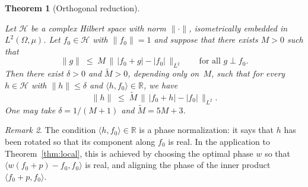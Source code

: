 \documentclass[11pt]{amsart}
\newtheorem{theorem}{Theorem}[section]
\theoremstyle{remark}
\newtheorem{remark}[theorem]{Remark}
\begin{document}
\begin{theorem}[Orthogonal reduction]\label{thm:reduction}
\par
Let $\mathcal{H}$ be a complex Hilbert space with norm $\lVert \cdot \rVert$, isometrically
embedded in $L^2(\Omega,\mu)$.  Let $f_0 \in \mathcal{H}$ with $\lVert f_0 \rVert = 1$ and
suppose that there exists $M > 0$ such that
\begin{equation}\label{eq:orthog-hyp}
\lVert g \rVert
\;\le\;
M\, \bigl\|\, \lvert f_0 + g \rvert - \lvert f_0 \rvert \,\bigr\|_{L^2}
\qquad
\text{for all } g \perp f_0.
\end{equation}
Then there exist $\delta > 0$ and $\widetilde{M} > 0$, depending only
on~$M$, such that
for every $h \in \mathcal{H}$ with $\lVert h \rVert \le \delta$ and
$\langle h,f_0\rangle \in \mathbb{R}$, we have
\[
\lVert h \rVert
\;\le\;
\widetilde{M}\, \bigl\|\, \lvert f_0 + h \rvert - \lvert f_0 \rvert \,\bigr\|_{L^2}.
\]
One may take $\delta = 1/(M+1)$ and $\widetilde{M} = 5M + 3$.
\end{theorem}

\begin{remark}
The condition $\langle h,f_0\rangle \in \mathbb{R}$ is a phase normalization: it says that
$h$ has been rotated so that its component along $f_0$ is real.  In the
application to Theorem~\ref{thm:local}, this is achieved by choosing the
optimal phase $w$ so that $\langle w(f_0 + p) - f_0,f_0\rangle$ is real, and aligning the phase of the inner product
$\langle f_0+p,f_0\rangle$.
\end{remark}
\end{document}
